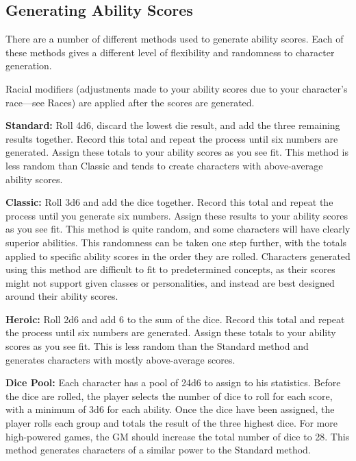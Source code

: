 \subsection{Generating Ability Scores}

				
There are a number of different methods used to generate ability scores. Each of these methods gives a different level of flexibility and randomness to character generation. 
				
Racial modifiers (adjustments made to your ability scores due to your character's race---see Races) are applied after the scores are generated.
				
\textbf{Standard:} Roll 4d6, discard the lowest die result, and add the three remaining results together. Record this total and repeat the process until six numbers are generated. Assign these totals to your ability scores as you see fit. This method is less random than Classic and tends to create characters with above-average ability scores.
				
\textbf{Classic:} Roll 3d6 and add the dice together. Record this total and repeat the process until you generate six numbers. Assign these results to your ability scores as you see fit. This method is quite random, and some characters will have clearly superior abilities. This randomness can be taken one step further, with the totals applied to specific ability scores in the order they are rolled. Characters generated using this method are difficult to fit to predetermined concepts, as their scores might not support given classes or personalities, and instead are best designed around their ability scores.
				
\textbf{Heroic:} Roll 2d6 and add 6 to the sum of the dice. Record this total and repeat the process until six numbers are generated. Assign these totals to your ability scores as you see fit. This is less random than the Standard method and generates characters with mostly above-average scores.
				
\textbf{Dice Pool: }Each character has a pool of 24d6 to assign to his statistics. Before the dice are rolled, the player selects the number of dice to roll for each score, with a minimum of 3d6 for each ability. Once the dice have been assigned, the player rolls each group and totals the result of the three highest dice. For more high-powered games, the GM should increase the total number of dice to 28. This method generates characters of a similar power to the Standard method.

